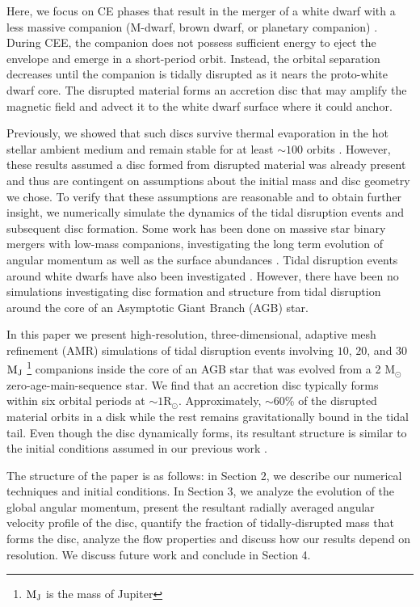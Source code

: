 \documentclass[fleqn,usenatbib]{mnras}
\begin{document}
Here, we focus on CE phases that result in the merger of a white dwarf with a less massive companion (M-dwarf, brown dwarf, or planetary companion) \citep{Nordhaus:2011aa,Nordhaus:2013aa,Guidarelli2019}. During CEE, the companion does not possess sufficient energy to eject the envelope and emerge in a short-period orbit.  Instead, the orbital separation decreases until the companion is tidally disrupted as it nears the proto-white dwarf core.  The disrupted material forms an accretion disc that may amplify the magnetic field and advect it to the white dwarf surface where it could anchor.

Previously, we showed that such discs survive thermal evaporation in the hot stellar ambient medium and remain stable for at least $\sim$$100$ orbits \citep{Guidarelli2019}. However, these results assumed a disc formed from disrupted material was already present and thus are contingent on assumptions about the initial mass and disc geometry we chose. To verify that these assumptions are reasonable and to obtain further insight, we numerically simulate the dynamics of the tidal disruption events and subsequent disc formation. Some work has been done on massive star binary mergers with low-mass companions, investigating the long term evolution of angular momentum as well as the surface abundances \citep{Manos_2020,Wu_2020}. Tidal disruption events around white dwarfs have also been investigated \citep{Malamud_2020,Veras_2014}. However, there have been no simulations investigating disc formation and structure from tidal disruption around the core of an Asymptotic Giant Branch (AGB) star. 

In this paper we present high-resolution, three-dimensional, adaptive mesh refinement (AMR) simulations of tidal disruption events involving $10$, $20$, and $30$ ${\rm M_J}$ \footnote{$\mathrm{M_{\rm J}}$ is the mass of Jupiter} companions inside the core of an AGB star that was evolved from a 2 $\mathrm{M_\odot}$ zero-age-main-sequence star.  We find that an accretion disc typically forms within six orbital periods at $\sim$$\mathrm{1 R_\odot}$.  Approximately, $\sim$60\% of the disrupted material orbits in a disk
while the rest remains gravitationally bound in the tidal tail.
Even though the disc dynamically forms, its resultant structure is similar to the initial conditions assumed in our previous work \citep{Guidarelli2019}.

The structure of the paper is as follows: in Section 2, we describe our numerical techniques and initial conditions. In Section 3, we analyze the evolution of the global angular momentum, present the resultant radially averaged angular velocity profile of the disc, quantify the fraction of tidally-disrupted mass that forms the disc, analyze the flow properties and discuss how our results depend on resolution. We discuss future work and conclude in Section 4.   
\end{document}
